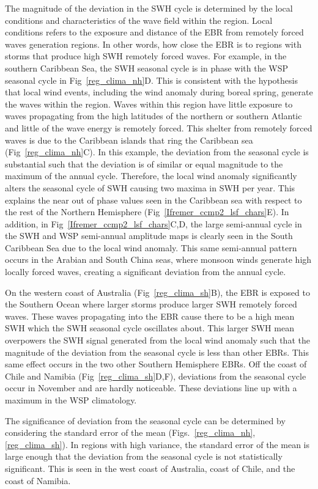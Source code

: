 \documentclass[draft,linenumbers]{agujournal2018}
\begin{document}
The magnitude of the deviation in the SWH cycle is determined by the local conditions and characteristics of the wave field within the region. Local conditions refers to the exposure and distance of the EBR from remotely forced waves generation regions. In other words, how close the EBR is to regions with storms that produce high SWH remotely forced waves. For example, in the southern Caribbean Sea, the SWH  seasonal cycle is in phase with the WSP seasonal cycle in Fig~\ref{reg_clima_nh}D. This is consistent with the hypothesis that local wind events, including the wind anomaly during boreal spring, generate the waves within the region. Waves within this region have little exposure to waves propagating from the high latitudes of the northern or southern Atlantic and little of the wave energy is remotely forced.  This shelter from remotely forced waves is due to the Caribbean islands that ring the Caribbean sea (Fig~\ref{reg_clima_nh}C). In this example, the deviation from the seasonal cycle is substantial such that the deviation is of similar or equal magnitude to the maximum of the annual cycle. Therefore, the local wind anomaly significantly alters the seasonal cycle of SWH causing two maxima in SWH per year. This explains the near out of phase values seen in the Caribbean sea with respect to the rest of the Northern Hemisphere  (Fig~\ref{Ifremer_ccmp2_lsf_chars}E). In addition, in Fig~\ref{Ifremer_ccmp2_lsf_chars}C,D, the large semi-annual cycle in the SWH and WSP semi-annual amplitude maps is clearly seen in the South Caribbean Sea due to the local wind anomaly. This same semi-annual pattern occurs in the Arabian and South China seas, where monsoon winds generate high locally forced waves, creating a significant deviation from the annual cycle.   

On the western coast of Australia (Fig~\ref{reg_clima_sh}B), the EBR is exposed to the Southern Ocean where larger storms produce larger SWH remotely forced waves. These waves propagating into the EBR cause there to be a high mean SWH which the SWH seasonal cycle oscillates about. This larger SWH mean overpowers the SWH signal generated from the local wind anomaly such that the magnitude of the deviation from the seasonal cycle is less than other EBRs. This same effect occurs in the two other Southern Hemisphere EBRs. Off the coast of Chile and Namibia (Fig~\ref{reg_clima_sh}D,F), deviations from the seasonal cycle occur in November and are hardly noticeable. These deviations line up with a maximum in the WSP climatology.

The significance of deviation from the seasonal cycle can be determined by considering the standard error of the mean (Figs.~\ref{reg_clima_nh},\ref{reg_clima_sh}). In regions with high variance, the standard error of the mean is large enough that the deviation from the seasonal cycle is not statistically significant. This is seen in the west coast of Australia, coast of Chile, and the coast of Namibia.  
\end{document}
